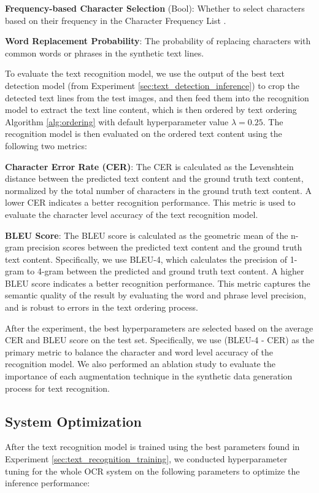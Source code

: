 \documentclass[12pt,twoside]{report}
\begin{document}
\textbf{Frequency-based Character Selection} (Bool): Whether to select characters based on their frequency in the Character Frequency List \cite{charlist}.

\textbf{Word Replacement Probability}: The probability of replacing characters with common words or phrases \cite{wordlist} in the synthetic text lines.

To evaluate the text recognition model, we use the output of the best text detection model (from Experiment \ref{sec:text_detection_inference}) to crop the detected text lines from the test images, and then feed them into the recognition model to extract the text line content, which is then ordered by text ordering Algorithm \ref{alg:ordering} with default hyperparameter value $\lambda = 0.25$. The recognition model is then evaluated on the ordered text content using the following two metrics:

\textbf{Character Error Rate (CER)}: The CER is calculated as the Levenshtein distance between the predicted text content and the ground truth text content, normalized by the total number of characters in the ground truth text content. A lower CER indicates a better recognition performance. This metric is used to evaluate the character level accuracy of the text recognition model.

\textbf{BLEU Score}: The BLEU score is calculated as the geometric mean of the n-gram precision scores between the predicted text content and the ground truth text content. Specifically, we use BLEU-4, which calculates the precision of 1-gram to 4-gram between the predicted and ground truth text content. A higher BLEU score indicates a better recognition performance. This metric captures the semantic quality of the result by evaluating the word and phrase level precision, and is robust to errors in the text ordering process.

After the experiment, the best hyperparameters are selected based on the average CER and BLEU score on the test set. Specifically, we use (BLEU-4 - CER) as the primary metric to balance the character and word level accuracy of the recognition model. We also performed an ablation study to evaluate the importance of each augmentation technique in the synthetic data generation process for text recognition.

\subsection{System Optimization}
\label{sec:system_optimization}
After the text recognition model is trained using the best parameters found in Experiment \ref{sec:text_recognition_training}, we conducted hyperparameter tuning for the whole OCR system on the following parameters to optimize the inference performance:
\end{document}
